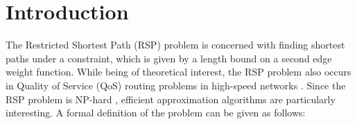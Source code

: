 \documentclass[a4paper, 10pt, oneside]{article}
\theoremstyle{plain}
\theoremstyle{definition}
\numberwithin{equation}{section}
\newcommand{\calO}{\mathcal{O}}
\newcommand{\compLeq}[1]{\calO\left( #1 \right)}
\begin{document}
\begin{abstract}
\begin{comment}
In this paper, we present a fully-polynomial-time approximation scheme (FPTAS) that finds a $(1 + \varepsilon)$-approximation to the problem in time $\compLeq{nm\left(1/\varepsilon + \log \log \log n\right)}$, improving the general bound by Lorenz and Raz \cite{lorenz2001}. An alternative solution has a time complexity of $\compLeq{nm \left( 1/\varepsilon + \frac{n \log n}{m} \right)}$. In addition, improvements for special cases are derived, e.g. a runtime bound of $\compLeq{nm\left(1/\varepsilon + 1\right)}$ for planar graphs, undirected graphs with positive integer resource values and directed acyclic graphs (equalizing the result from Ergun et al. \cite{ergun2002}).
\end{comment}
\end{abstract}


\section{Introduction}

The Restricted Shortest Path (RSP) problem is concerned with finding shortest paths under a constraint, which is given by a length bound on a second edge weight function. While being of theoretical interest, the RSP problem also occurs in Quality of Service (QoS) routing problems in high-speed networks \cite{ergun2002}. Since the RSP problem is NP-hard \cite{garey1979}, efficient approximation algorithms are particularly interesting. A formal definition of the problem can be given as follows:
\end{document}
